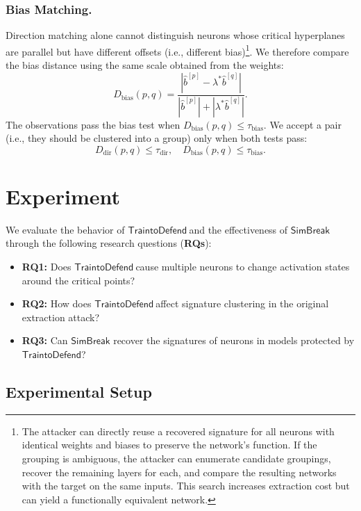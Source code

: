 \documentclass[runningheads]{llncs}
\newcommand{\td}{$\mathsf{Train to Defend}~$}
\newcommand{\ours}{{$\mathsf{SimBreak}$}\xspace}
\begin{document}
\subsubsection{Bias Matching.}
Direction matching alone cannot distinguish neurons whose critical hyperplanes are parallel but have different offsets (i.e., different bias)\footnote{The attacker can directly reuse a recovered signature for all neurons with identical weights and biases to preserve the network's function.
If the grouping is ambiguous, the attacker can enumerate candidate groupings, recover the remaining layers for each, and compare the resulting networks with the target on the same inputs.
This search increases extraction cost but can yield a functionally equivalent network.}.
We therefore compare the bias distance using the same scale obtained from the weights:
\begin{equation*}
D_{\mathrm{bias}}(p,q)=\frac{\left|\widehat b^{[p]}-\lambda^*\widehat b^{[q]}\right|}{\left|\widehat b^{[p]}\right|+\left|\lambda^*\widehat b^{[q]}\right|}.
\end{equation*}
The observations pass the bias test when
$D_{\mathrm{bias}}(p,q)\leq\tau_{\mathrm{bias}}$.
We accept a pair (i.e., they should be clustered into a group) only when both tests pass:
\begin{equation*}
 D_{\mathrm{dir}}(p,q)\leq\tau_{\mathrm{dir}},
 \quad
 D_{\mathrm{bias}}(p,q)\leq\tau_{\mathrm{bias}}.
\end{equation*}

\section{Experiment}
\label{sec:experiments}
We evaluate the behavior of \td and the effectiveness of \ours through the following research questions (\textbf{RQs}):
\begin{itemize}
\item \textbf{RQ1:} Does \td cause multiple neurons to change activation states around the critical points?
\item \textbf{RQ2:} How does \td affect signature clustering in the original extraction attack?
\item \textbf{RQ3:} Can \ours recover the signatures of neurons in models protected by $\mathsf{TraintoDefend}$?
\end{itemize}
\subsection{Experimental Setup}
\label{sec:experimental-setup}
\end{document}
